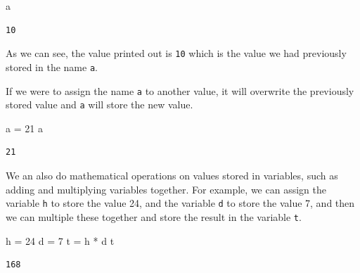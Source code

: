 \documentclass[
  letterpaper,
  DIV=11,
  numbers=noendperiod]{scrreprt}
\newenvironment{Shaded}{\begin{snugshade}}{\end{snugshade}}
\newcommand{\DecValTok}[1]{\textcolor[rgb]{0.68,0.00,0.00}{#1}}
\newcommand{\NormalTok}[1]{\textcolor[rgb]{0.00,0.23,0.31}{#1}}
\newcommand{\OperatorTok}[1]{\textcolor[rgb]{0.37,0.37,0.37}{#1}}
\begin{document}
\begin{Shaded}
\begin{Highlighting}[]
\NormalTok{a}
\end{Highlighting}
\end{Shaded}

\begin{verbatim}
10
\end{verbatim}

As we can see, the value printed out is \texttt{10} which is the value
we had previously stored in the name \texttt{a}.

If we were to assign the name \texttt{a} to another value, it will
overwrite the previously stored value and \texttt{a} will store the new
value.

\begin{Shaded}
\begin{Highlighting}[]
\NormalTok{a }\OperatorTok{=} \DecValTok{21}
\NormalTok{a}
\end{Highlighting}
\end{Shaded}

\begin{verbatim}
21
\end{verbatim}

We an also do mathematical operations on values stored in variables,
such as adding and multiplying variables together. For example, we can
assign the variable \texttt{h} to store the value 24, and the variable
\texttt{d} to store the value 7, and then we can multiple these together
and store the result in the variable \texttt{t}.

\begin{Shaded}
\begin{Highlighting}[]
\NormalTok{h }\OperatorTok{=} \DecValTok{24}
\NormalTok{d }\OperatorTok{=} \DecValTok{7}
\NormalTok{t }\OperatorTok{=}\NormalTok{ h }\OperatorTok{*}\NormalTok{ d}
\NormalTok{t}
\end{Highlighting}
\end{Shaded}

\begin{verbatim}
168
\end{verbatim}
\end{document}
